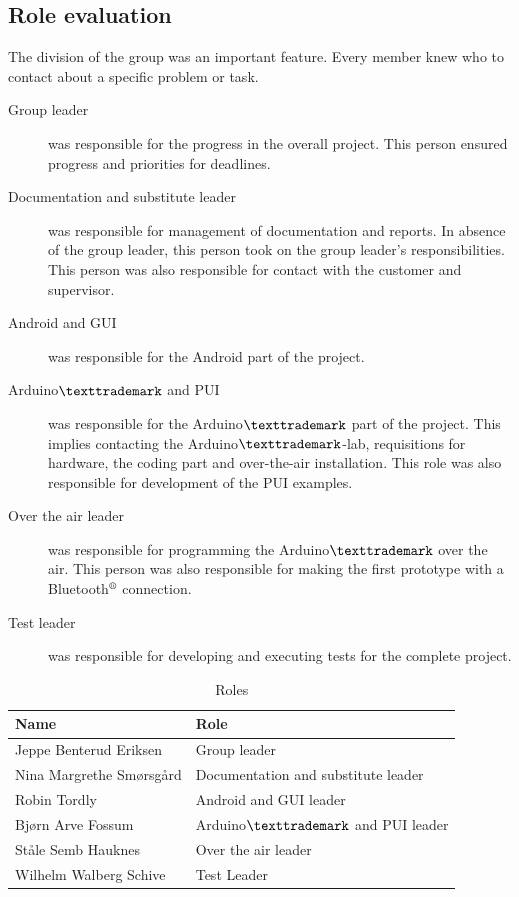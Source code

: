 \subsection{Role evaluation}
The division of the group was an important feature. Every member knew who to contact about a specific problem or task.\\

\begin{description}
	\item[Group leader]{was responsible for the progress in the overall project. This person ensured progress and priorities for deadlines.}
	\item[Documentation and substitute leader]{was responsible for management of documentation and reports. In absence of the group leader, this person took on the group leader's responsibilities. This person was also responsible for contact with the customer and supervisor.}
	\item[Android and GUI]{was responsible for the Android part of the project.}
	\item[Arduino$\texttrademark$ and PUI]{was responsible for the Arduino$\texttrademark$ part of the project. This implies contacting the Arduino$\texttrademark$-lab, requisitions for hardware, the coding part and over-the-air installation. This role was also responsible for development of the PUI examples.}
	\item[Over the air leader]{was responsible for programming the Arduino$\texttrademark$ over the air. This person was also responsible for making the first prototype with a Bluetooth$\textsuperscript{\textregistered}$  connection.}
	\item[Test leader]{was responsible for developing and executing tests for the complete project.}
\end{description}

\begin{table}
\begin{tabular}{|l|l|}
\hline
	{\bf Name} & {\bf Role}\\
\hline
	Jeppe Benterud Eriksen & Group leader\\
\hline
	Nina Margrethe Smørsgård & Documentation and substitute leader\\
\hline
	Robin Tordly & Android and GUI leader\\
\hline
	Bjørn Arve Fossum & Arduino$\texttrademark$ and PUI leader\\
\hline
	Ståle Semb Hauknes & Over the air leader\\
\hline
	Wilhelm Walberg Schive & Test Leader\\
\hline
\end{tabular}
\caption{Roles}
\end{table}

